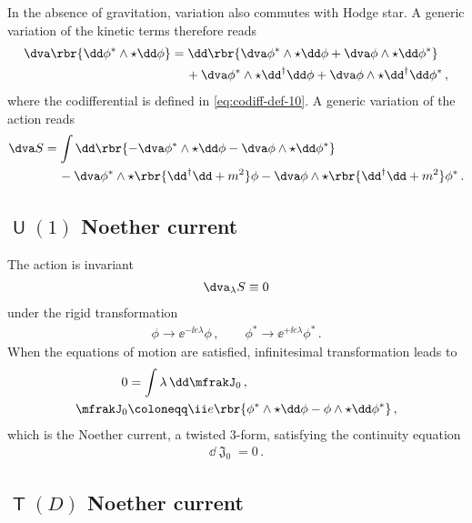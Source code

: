 \documentclass[a4paper]{article}
\begin{document}
In the absence of gravitation, variation also commutes with Hodge star. A 
generic variation of the kinetic terms therefore reads
\begin{align}
\begin{split}
\dva \rbr{\dd \phi^*\wedge\star\dd\phi} &= 
\dd\rbr{\dva\phi^*\wedge\star\dd\phi + \dva\phi\wedge\star\dd\phi^*}
\\
&\quad\,+
\dva\phi^*\wedge\star\dd^{\dagger}\dd\phi +
\dva\phi\wedge\star\dd^{\dagger}\dd\phi^*\,,
\end{split}
\end{align}
where the codifferential is defined in \cref{eq:codiff-def-10}.
A generic variation of the action reads
\begin{align}
\dva S &=
\int \dd\rbr{-\dva\phi^*\wedge\star\dd\phi -
\dva\phi\wedge\star\dd\phi^*}
\nonumber \\
&\quad\,-
\dva\phi^*\wedge\star\rbr{\dd^{\dagger}\dd+m^2}\phi -
\dva\phi\wedge\star\rbr{\dd^{\dagger}\dd+m^2}\phi^*\,.
\end{align}

\subsection[$U(1)$ Noether current]{$\msansU(1)$ Noether current}


The action is invariant
\begin{align}
\dva_{\lambda} S \equiv 0
\end{align}
under the rigid transformation
\begin{align}
\phi \to \ee^{-\ii e \lambda} \phi\,,\qquad
\phi^* \to \ee^{+\ii e \lambda} \phi^*\,.
\end{align}
When the equations of motion are satisfied, infinitesimal 
transformation leads to
\begin{align}
0 &= \int \lambda\, \dd \mfrakJ_0\,,
\nonumber \\
\mfrakJ_0 &\coloneqq \ii e\rbr{\phi^*\wedge\star\dd\phi
	- \phi\wedge\star\dd\phi^*}\,,
\end{align}
which is the Noether current, a twisted $3$-form, satisfying the continuity 
equation
\begin{align}
\dd \mfrakJ_0 = 0\,.
\end{align}

\subsection[$T(D)$ Noether current]{$\msansT(D)$ Noether current}
\end{document}
